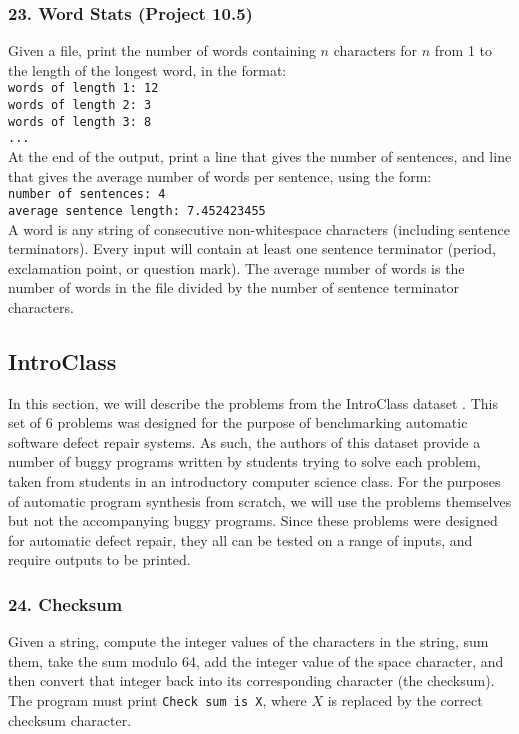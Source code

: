 \documentclass{sig-alternate}
\begin{document}
\subsubsection*{23. Word Stats (Project 10.5)}
Given a file, print the number of words containing $n$ characters for $n$ from 1 to the length of the longest word, in the format:
\texttt{ \\
words of length 1: 12 \\
words of length 2: 3 \\
words of length 3: 8 \\
... \\
} %
At the end of the output, print a line that gives the number of sentences, and line that gives the average number of words per sentence, using the form:
\texttt{ \\
number of sentences: 4 \\
average sentence length: 7.452423455 \\
} %
A word is any string of consecutive non-whitespace characters (including sentence terminators). Every input will contain at least one sentence terminator (period, exclamation point, or question mark). The average number of words is the number of words in the file divided by the number of sentence terminator characters.

\subsection{IntroClass}

In this section, we will describe the problems from the IntroClass dataset \cite{ManyBugsAndIntroClass, Brun13TRgptest}. This set of 6 problems was designed for the purpose of benchmarking automatic software defect repair systems. As such, the authors of this dataset provide a number of buggy programs written by students trying to solve each problem, taken from students in an introductory computer science class. For the purposes of automatic program synthesis from scratch, we will use the problems themselves but not the accompanying buggy programs. Since these problems were designed for automatic defect repair, they all can be tested on a range of inputs, and require outputs to be printed.

\subsubsection*{24. Checksum}
Given a string, compute the integer values of the characters in the string, sum them, take the sum modulo 64, add the integer value of the space character, and then convert that integer back into its corresponding character (the checksum). The program must print \texttt{Check sum is X}, where $X$ is replaced by the correct checksum character.
\end{document}
